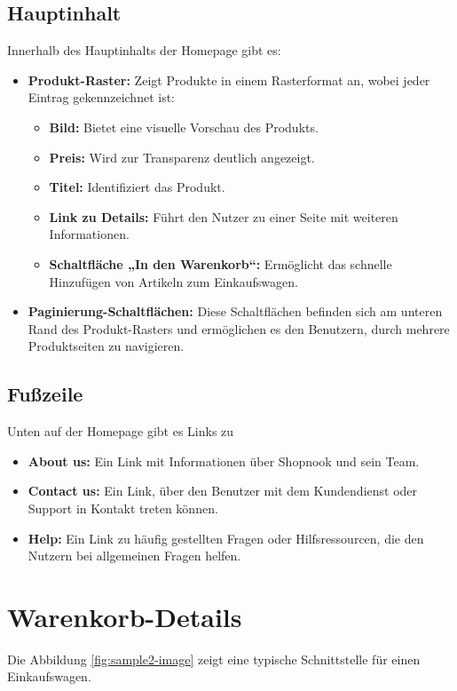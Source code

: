  \subsection{Hauptinhalt}
Innerhalb des Hauptinhalts der Homepage gibt es:
\begin{itemize}
	\item \textbf{Produkt-Raster:} Zeigt Produkte in einem Rasterformat an, wobei jeder Eintrag gekennzeichnet ist:
	\begin{itemize}
		\item \textbf{Bild:} Bietet eine visuelle Vorschau des Produkts.
		\item \textbf{Preis:} Wird zur Transparenz deutlich angezeigt.
		\item \textbf{Titel:} Identifiziert das Produkt.
		\item \textbf{Link zu Details:} Führt den Nutzer zu einer Seite mit weiteren Informationen.
		\item \textbf{Schaltfläche „In den Warenkorb“:} Ermöglicht das schnelle Hinzufügen von Artikeln zum Einkaufswagen.
	\end{itemize}
	\item \textbf{Paginierung-Schaltflächen:} Diese Schaltflächen befinden sich am unteren Rand des Produkt-Rasters und ermöglichen es den Benutzern, durch mehrere Produktseiten zu navigieren.
\end{itemize}


 \subsection{Fußzeile}

Unten auf der Homepage gibt es Links zu
\begin{itemize}
	\item \textbf{About us:} Ein Link mit Informationen über Shopnook und sein Team.
	\item \textbf{Contact us:} Ein Link, über den Benutzer mit dem Kundendienst oder Support in Kontakt treten können.
	\item \textbf{Help:} Ein Link zu häufig gestellten Fragen oder Hilfsressourcen, die den Nutzern bei allgemeinen Fragen helfen.
\end{itemize}


\section{Warenkorb-Details}

Die Abbildung \ref{fig:sample2-image} zeigt eine typische Schnittstelle für einen Einkaufswagen.

